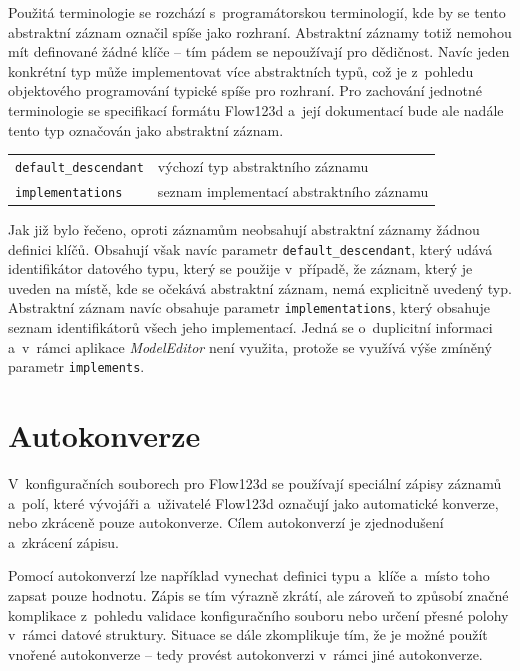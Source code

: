 \documentclass[FM,bw,DP]{tulthesis}
\begin{document}

Použitá terminologie se rozchází s~programátorskou terminologií, kde by se tento abstraktní záznam označil spíše jako rozhraní. Abstraktní záznamy totiž nemohou mít definované žádné klíče -- tím pádem se nepoužívají pro dědičnost. Navíc jeden konkrétní typ může implementovat více abstraktních typů, což je z~pohledu objektového programování typické spíše pro rozhraní. Pro zachování jednotné terminologie se specifikací formátu Flow123d a~její dokumentací bude ale nadále tento typ označován jako abstraktní záznam.

\vspace{0.5cm}
\begin{tabular}{m{5cm}@{}l}
\texttt{default\_descendant}\dotfill & výchozí typ abstraktního záznamu \\
\texttt{implementations}\dotfill & seznam implementací abstraktního záznamu \\
\end{tabular}
\vspace{0.5cm}

Jak již bylo řečeno, oproti záznamům neobsahují abstraktní záznamy žádnou definici klíčů. Obsahují však navíc parametr \texttt{default\_descendant}, který udává identifikátor datového typu, který se použije v~případě, že záznam, který je uveden na místě, kde se očekává abstraktní záznam, nemá explicitně uvedený typ. Abstraktní záznam navíc obsahuje parametr \texttt{implementations}, který obsahuje seznam identifikátorů všech jeho implementací. Jedná se o~duplicitní informaci a~v~rámci aplikace \textit{ModelEditor} není využita, protože se využívá výše zmíněný parametr \texttt{implements}.


\section{Autokonverze}
\label{sec:analyza-autokonverze}

V~konfiguračních souborech pro Flow123d se používají speciální zápisy záznamů a~polí, které vývojáři a~uživatelé Flow123d označují jako automatické konverze, nebo zkráceně pouze autokonverze. Cílem autokonverzí je zjednodušení a~zkrácení zápisu.

Pomocí autokonverzí lze například vynechat definici typu a~klíče a~místo toho zapsat pouze hodnotu. Zápis se tím výrazně zkrátí, ale zároveň to způsobí značné komplikace z~pohledu validace konfiguračního souboru nebo určení přesné polohy v~rámci datové struktury. Situace se dále zkomplikuje tím, že je možné použít vnořené autokonverze -- tedy provést autokonverzi v~rámci jiné autokonverze.
\end{document}
